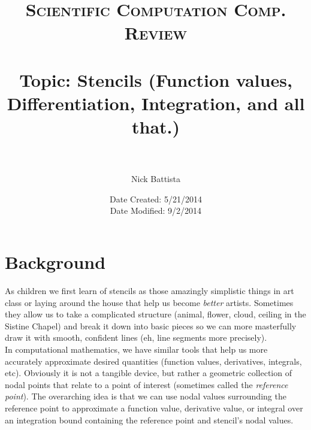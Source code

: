 \documentclass[paper=a4, fontsize=11pt]{scrartcl} %
\title{	
\normalfont \normalsize 
\textsc{Scientific Computation Comp. Review} \\ [25pt] %
\horrule{1pt} \\[0.05cm] %
\huge Topic: Stencils (Function values, Differentiation, Integration, and all that.) \\ %
\horrule{1pt} \\[0.05cm] %
}
\author{Nick Battista} %
\date{\normalsize Date Created: 5/21/2014\\ Date Modified: 9/2/2014} %
\numberwithin{equation}{section} %
\numberwithin{figure}{section} %
\numberwithin{table}{section} %
\begin{document}
\maketitle %

\section{Background}

As children we first learn of stencils as those amazingly simplistic things in art class or laying around the house that help us become \emph{better} artists.  Sometimes they allow us to take a complicated structure (animal, flower, cloud, ceiling in the Sistine Chapel) and break it down into basic pieces so we can more masterfully draw it with smooth, confident lines (eh, line segments more precisely). \\

In computational mathematics, we have similar tools that help us more accurately approximate desired quantities (function values, derivatives, integrals, etc). Obviously it is not a tangible device, but rather a geometric collection of nodal points that relate to a point of interest (sometimes called the \emph{reference point}). The overarching idea is that we can use nodal values surrounding the reference point to approximate a function value, derivative value, or integral over an integration bound containing the reference point and stencil's nodal values. \\



$ $\\




\end{document}

